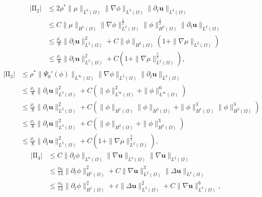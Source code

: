 \documentclass[11pt]{article}
\numberwithin{equation}{section}
\begin{document}
\begin{equation}\label{4.26}
\begin{split}
|\text{II}_2|&\leq 2\rho^*\|\mu\|_{L^6(\Omega)}\|\nabla\phi\|_{L^3(\Omega)}
\|\partial_t\mathbf{u}\|_{L^2(\Omega)} \\
&\leq C\|\mu\|_{H^1(\Omega)}\|\nabla\phi\|_{L^2(\Omega)}^{\frac{1}{2}}
\|\phi\|_{H^2(\Omega)}^{\frac{1}{2}}\|\partial_t\mathbf{u}\|_{L^2(\Omega)}\\
&\leq \frac{\rho_*}{8}\|\partial_t\mathbf{u}\|_{L^2(\Omega)}^2 + C\|\phi\|_{H^2(\Omega)}(1 + \|\nabla\mu\|_{L^2(\Omega)}) \\
&\leq \frac{\rho_*}{8}\|\partial_t\mathbf{u}\|_{L^2(\Omega)}^2 + C(1 + \|\nabla\mu\|_{L^2(\Omega)}^{\frac{5}{2}}),
\end{split}
\end{equation}
\begin{equation}\label{4.27}
\begin{split}
|\text{II}_3|&\leq \rho^*\|\Psi_0'(\phi)\|_{L^{\infty}(\Omega)}\|\nabla\phi\|_{L^2(\Omega)}
\|\partial_t\mathbf{u}\|_{L^2(\Omega)} \\
&\leq \frac{\rho_*}{8}\|\partial_t\mathbf{u}\|_{L^2(\Omega)}^2 + C(\|\phi\|_{L^{\infty}(\Omega)}^2 + \|\phi\|_{L^{\infty}(\Omega)}^6) \\
&\leq \frac{\rho_*}{8}\|\partial_t\mathbf{u}\|_{L^2(\Omega)}^2 + C(\|\phi\|_{H^1(\Omega)}\|\phi\|_{H^2(\Omega)} + \|\phi\|_{H^1(\Omega)}^3\|\phi\|_{H^2(\Omega)}^3)\\
&\leq \frac{\rho_*}{8}\|\partial_t\mathbf{u}\|_{L^2(\Omega)}^2 + C(\|\phi\|_{H^2(\Omega)} + \|\phi\|_{H^2(\Omega)}^3) \\
&\leq \frac{\rho_*}{8}\|\partial_t\mathbf{u}\|_{L^2(\Omega)}^2 + C(1 + \|\nabla\mu\|_{L^2(\Omega)}^{\frac{3}{2}}) ,
\end{split}
\end{equation}
\begin{equation}\label{4.28}
\begin{split}
|\text{II}_4|&\leq C\|\partial_t\phi\|_{L^6(\Omega)}\|\nabla\mathbf{u}\|_{L^3(\Omega)}
\|\nabla\mathbf{u}\|_{L^2(\Omega)} \\
&\leq \frac{\alpha_0}{14}\|\partial_t\phi\|_{H^1(\Omega)}^2 + C\|\nabla\mathbf{u}\|_{L^2(\Omega)}^3\|\Delta\mathbf{u}\|_{L^2(\Omega)} \\
&\leq \frac{\alpha_0}{14}\|\partial_t\phi\|_{H^1(\Omega)}^2 + \varepsilon\|\Delta\mathbf{u}\|_{L^2(\Omega)}^2 + C\|\nabla\mathbf{u}\|_{L^2(\Omega)}^6,
\end{split}
\end{equation}
\end{document}
